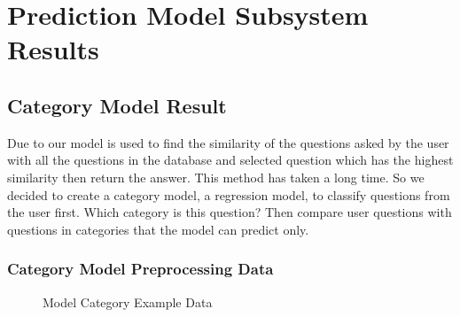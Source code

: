 \documentclass[12pt,oneside,openright,a4paper]{cpe-english-project}
\begin{document}
\pagebreak
\section{Prediction Model Subsystem Results}
\subsection{Category Model Result}
Due to our model is used to find the similarity of the questions asked by the user with all the questions in the database and selected question which has the highest similarity then return the answer. This method has taken a long time. So we decided to create a category model, a regression model, to classify questions from the user first. Which category is this question? Then compare user questions with questions in categories that the model can predict only.
\subsubsection{Category Model Preprocessing Data}
\begin{figure}[!h]\centering
{}
\caption{Model Category Example Data}\label{fig:Model Category Example Data}
\end{figure}
\pagebreak
\end{document}
